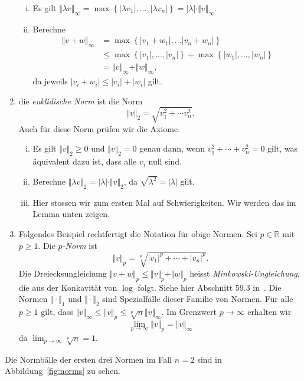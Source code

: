 \documentclass[../main.tex]{subfiles}
\begin{document}
\begin{examples}
\begin{enumerate}[(1)]
\begin{enumerate}[(i)]
        \item Es gilt $\Vert \lambda v \Vert_{\infty}
          = \max \left\{|\lambda v_1|, \dots, |\lambda v_n|\right\} = |\lambda|
          \cdot \Vert v \Vert_\infty$.
        \item Berechne
          \begin{align*}
            \Vert v + w \Vert_\infty
            &= \max \left\{|v_1 + w_1|, \dots |v_n + w_n|\right\} \\
            &\leq \max \left\{|v_{1}|, \dots, |v_{n}|\right\}
            + \max \left\{|w_{1}|, \dots, |w_{n}|\right\} \\
            &= \Vert v \Vert_{\infty} + \Vert w \Vert_{\infty},
          \end{align*}
          da jeweils $|v_i + w_i| \leq |v_i| + |w_i| $ gilt.
      \end{enumerate}
    \item die \emph{euklidische Norm} ist die Norm
      \[
        \Vert v \Vert_2 = \sqrt{v_1^2 + \cdots v_n^2}.
      \]
      Auch für diese Norm prüfen wir die Axiome.
      \begin{enumerate}[(i)]
        \item Es gilt $\Vert v \Vert_2 \geq 0$ und
          $\Vert v \Vert_2 = 0$ genau dann, wenn
          $v_1^2 + \cdots + v_n^2 = 0$ gilt,
          was äquivalent dazu ist, dass alle $v_i$ null sind.
        \item Berechne $\Vert \lambda v \Vert_2 = |\lambda | \cdot
          \Vert v \Vert_2$, da $\sqrt{\lambda^2} = |\lambda|$ gilt.
        \item Hier stossen wir zum ersten Mal auf Schwierigkeiten.
          Wir werden das im Lemma unten zeigen.
      \end{enumerate}
    \item
      Folgendes Beispiel rechtfertigt die Notation
      für obige Normen. Sei $p \in \mathbb{R}$ mit $p \geq 1$.
      Die \emph{$p$-Norm} ist
       \[
         \Vert v \Vert_p = \sqrt[p]{|v_1|^p + \cdots + |v_n|^p}.
      \]
      Die Dreiecksungleichung $\Vert v + w \Vert_p \leq
      \Vert v \Vert_p + \Vert w \Vert_p$ heisst
      \emph{Minkowski-Ungleichung}, die aus der
      Konkavität von $\log$ folgt. Siehe hier Abschnitt
      59.3 in~\cite{heuser}.
      Die Normen $\Vert \cdot \Vert_1$ und $\Vert \cdot \Vert_2$
      sind Spezialfälle dieser Familie von Normen.
      Für alle $p \geq 1$ gilt, dass $\Vert v \Vert_{\infty}
      \leq \Vert v \Vert_p \leq \sqrt[p]{n} \Vert v \Vert_{\infty}$.
      Im Grenzwert $p \to \infty$ erhalten wir
      \[
        \lim_{p \to \infty} \Vert v \Vert_p = \Vert v \Vert_{\infty}
      \]
      da $\lim_{p \to \infty} \sqrt[p]{n} = 1$.
  \end{enumerate}
  Die Normbälle der ersten drei Normen im Fall $n = 2$
  sind in Abbildung~\ref{fig:norms}
  zu sehen.
\end{examples}
\end{document}
